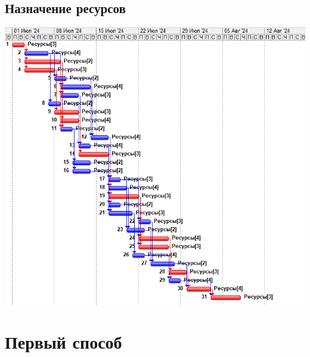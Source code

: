 \documentclass[14pt]{article}
\begin{document}
	\subsection{Назначение ресурсов}
	\includegraphics[width=\textwidth]{../img/init_resource_manage.png}
\section{Первый способ}
	
\end{document}
